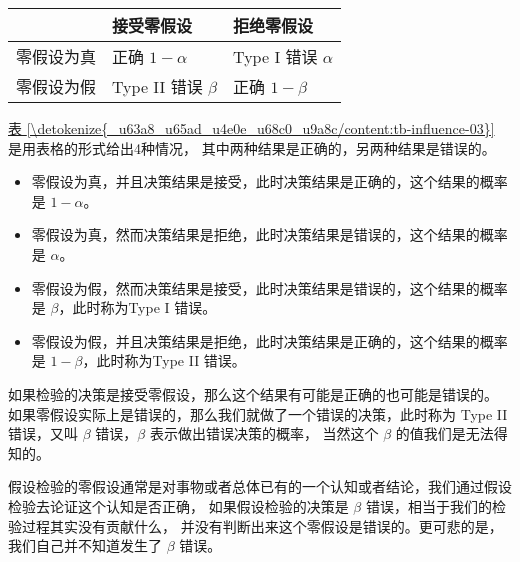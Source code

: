 \documentclass[letterpaper,10pt,english]{sphinxmanual}
\begin{document}
\begin{savenotes}\sphinxattablestart
\centering
{}
\sphinxthecaptionisattop
{}\label{\detokenize{_u63a8_u65ad_u4e0e_u68c0_u9a8c/content:id34}}\label{\detokenize{_u63a8_u65ad_u4e0e_u68c0_u9a8c/content:tb-influence-03}}
\sphinxaftertopcaption
\begin{tabulary}{\linewidth}[t]{|T|T|T|}
\hline
\sphinxstyletheadfamily &\sphinxstyletheadfamily 
接受零假设
&\sphinxstyletheadfamily 
拒绝零假设
\\
\hline
零假设为真
&
正确 \(1-\alpha\)
&
Type I 错误 \(\alpha\)
\\
\hline
零假设为假
&
Type II 错误 \(\beta\)
&
正确 \(1-\beta\)
\\
\hline
\end{tabulary}
\par
\sphinxattableend\end{savenotes}

\hyperref[\detokenize{_u63a8_u65ad_u4e0e_u68c0_u9a8c/content:tb-influence-03}]{表 \ref{\detokenize{_u63a8_u65ad_u4e0e_u68c0_u9a8c/content:tb-influence-03}}} 是用表格的形式给出4种情况，
其中两种结果是正确的，另两种结果是错误的。
\begin{itemize}
\item {} 
零假设为真，并且决策结果是接受，此时决策结果是正确的，这个结果的概率是 \(1-\alpha\)。

\item {} 
零假设为真，然而决策结果是拒绝，此时决策结果是错误的，这个结果的概率是 \(\alpha\)。

\item {} 
零假设为假，然而决策结果是接受，此时决策结果是错误的，这个结果的概率是 \(\beta\)，此时称为Type I 错误。

\item {} 
零假设为假，并且决策结果是拒绝，此时决策结果是正确的，这个结果的概率是 \(1-\beta\)，此时称为Type II 错误。

\end{itemize}


如果检验的决策是接受零假设，那么这个结果有可能是正确的也可能是错误的。
如果零假设实际上是错误的，那么我们就做了一个错误的决策，此时称为
Type II 错误，又叫 \(\beta\) 错误，\(\beta\) 表示做出错误决策的概率，
当然这个 \(\beta\) 的值我们是无法得知的。

假设检验的零假设通常是对事物或者总体已有的一个认知或者结论，我们通过假设检验去论证这个认知是否正确，
如果假设检验的决策是 \(\beta\) 错误，相当于我们的检验过程其实没有贡献什么，
并没有判断出来这个零假设是错误的。更可悲的是，我们自己并不知道发生了 \(\beta\) 错误。
\end{document}
